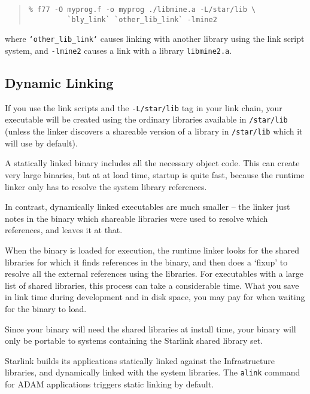 \documentclass[twoside,11pt]{article}
\newcommand{\xlabel}[1]{}
\begin{document}
\begin{quote}
\begin{verbatim}
% f77 -O myprog.f -o myprog ./libmine.a -L/star/lib \
         `bly_link` `other_lib_link` -lmine2
\end{verbatim}
\end{quote}

where \texttt{`other\_lib\_link`} causes linking with another library
using the link script system, and \texttt{-lmine2} causes a link with a
library \texttt{libmine2.a}.

\subsection{\xlabel{dynamic_linking}Dynamic Linking}
\label{dynamic_linking}

If you use the link scripts and the \texttt{-L/star/lib} tag in your link
chain, your executable will be created using the ordinary libraries
available in \texttt{/star/lib} (unless the linker discovers a shareable
version of a library in \texttt{/star/lib} which it will use by default).

A statically linked binary includes all the necessary object code.  This
can create very large binaries, but at at load time, startup is quite
fast, because the runtime linker only has to resolve the system library
references.

In contrast, dynamically linked executables are much smaller -- the
linker just notes in the binary which shareable libraries were used to
resolve which references, and leaves it at that.

When the binary is loaded for execution, the runtime linker looks for the
shared libraries for which it finds references in the binary, and then does a
`fixup' to resolve all the external references using the libraries.  For
executables with a large list of shared libraries, this process can take a
considerable time.  What you save in link time during development and in
disk space, you may pay for when waiting for the binary to load.

Since your binary will need the shared libraries at install time, your
binary will only be portable to systems containing the Starlink shared
library set.

Starlink builds its applications statically linked against the
Infrastructure libraries, and dynamically linked with the system
libraries.  The \texttt{alink} command for ADAM applications triggers static
linking by default.
\end{document}
